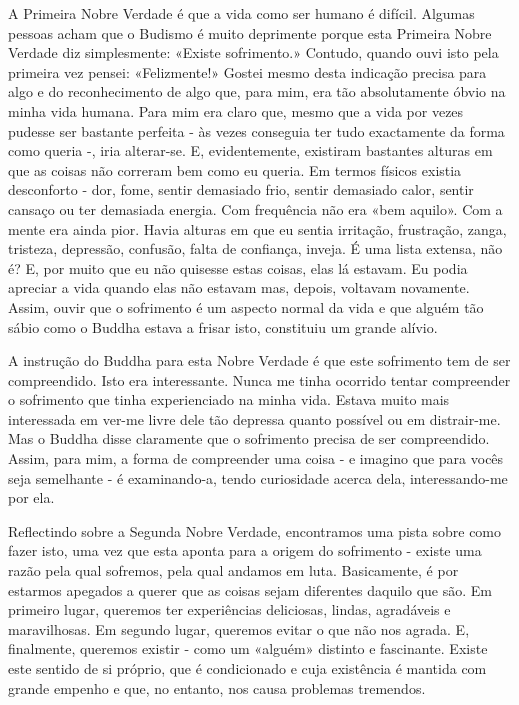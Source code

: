 A Primeira Nobre Verdade é que a vida como ser humano é difícil. Algumas
pessoas acham que o Budismo é muito deprimente porque esta Primeira
Nobre Verdade diz simplesmente: «Existe sofrimento.» Contudo, quando
ouvi isto pela primeira vez pensei: «Felizmente!» Gostei mesmo desta
indicação precisa para algo e do reconhecimento de algo que, para mim,
era tão absolutamente óbvio na minha vida humana. Para mim era claro
que, mesmo que a vida por vezes pudesse ser bastante perfeita - às vezes
conseguia ter tudo exactamente da forma como queria -, iria alterar-se.
E, evidentemente, existiram bastantes alturas em que as coisas não
correram bem como eu queria. Em termos físicos existia desconforto -
dor, fome, sentir demasiado frio, sentir demasiado calor, sentir cansaço
ou ter demasiada energia. Com frequência não era «bem aquilo». Com a
mente era ainda pior. Havia alturas em que eu sentia irritação,
frustração, zanga, tristeza, depressão, confusão, falta de confiança,
inveja. É uma lista extensa, não é? E, por muito que eu não quisesse
estas coisas, elas lá estavam. Eu podia apreciar a vida quando elas não
estavam mas, depois, voltavam novamente. Assim, ouvir que o sofrimento é
um aspecto normal da vida e que alguém tão sábio como o Buddha estava a
frisar isto, constituiu um grande alívio.

A instrução do Buddha para esta Nobre Verdade é que este sofrimento tem
de ser compreendido. Isto era interessante. Nunca me tinha ocorrido
tentar compreender o sofrimento que tinha experienciado na minha vida.
Estava muito mais interessada em ver-me livre dele tão depressa quanto
possível ou em distrair-me. Mas o Buddha disse claramente que o
sofrimento precisa de ser compreendido. Assim, para mim, a forma de
compreender uma coisa - e imagino que para vocês seja semelhante - é
\mbox{examinando-a}, tendo curiosidade acerca dela, interessando-me por ela.

Reflectindo sobre a Segunda Nobre Verdade, encontramos uma pista sobre
como fazer isto, uma vez que esta aponta para a origem do sofrimento -
existe uma razão pela qual sofremos, pela qual andamos em luta.
Basicamente, é por estarmos apegados a querer que as coisas sejam
diferentes daquilo que são. Em primeiro lugar, queremos ter experiências
deliciosas, lindas, agradáveis e maravilhosas. Em segundo lugar,
queremos evitar o que não nos agrada. E, finalmente, queremos existir -
como um «alguém» distinto e fascinante. Existe este sentido de si
próprio, que é condicionado e cuja existência é mantida com grande
empenho e que, no entanto, nos causa problemas tremendos.


